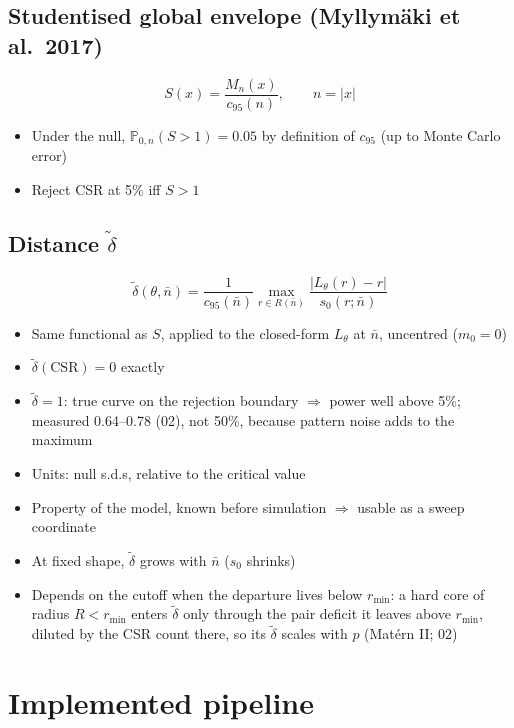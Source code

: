 \documentclass[11pt]{article}
\newcommand{\dt}{\tilde\delta}
\newcommand{\nb}{\bar n}
\begin{document}
\subsection*{Studentised global envelope (Myllym\"aki et al.\ 2017)}
\[
  S(x) = \frac{M_n(x)}{c_{95}(n)}, \qquad n = |x|
\]
\begin{itemize}
  \item Under the null, $\mathbb P_{0,n}(S > 1) = 0.05$ by definition of $c_{95}$ (up to Monte Carlo error)
  \item Reject CSR at 5\% iff $S > 1$
\end{itemize}

\subsection*{Distance $\dt$}
\[
  \dt(\theta,\nb) = \frac{1}{c_{95}(\nb)} \max_{r\in R(\nb)} \frac{|L_\theta(r) - r|}{s_0(r;\nb)}
\]
\begin{itemize}
  \item Same functional as $S$, applied to the closed-form $L_\theta$ at $\nb$, uncentred ($m_0 = 0$)
  \item $\dt(\text{CSR}) = 0$ exactly
  \item $\dt = 1$: true curve on the rejection boundary $\Rightarrow$ power well above 5\%; measured 0.64--0.78 (02), not 50\%, because pattern noise adds to the maximum
  \item Units: null s.d.s, relative to the critical value
  \item Property of the model, known before simulation $\Rightarrow$ usable as a sweep coordinate
  \item At fixed shape, $\dt$ grows with $\nb$ ($s_0$ shrinks)
  \item Depends on the cutoff when the departure lives below $r_{\min}$: a hard core of radius $R<r_{\min}$ enters $\dt$ only through the pair deficit it leaves above $r_{\min}$, diluted by the CSR count there, so its $\dt$ scales with $p$ (Mat\'ern II; 02)
\end{itemize}

\section{Implemented pipeline}
\end{document}

